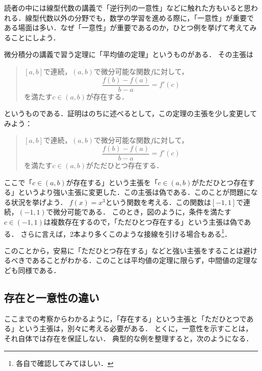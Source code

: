 読者の中には線型代数の講義で「逆行列の一意性」などに触れた方もいると思われる．線型代数以外の分野でも，数学の学習を進める際に，「一意性」が重要である場面は多い．なぜ「一意性」が重要であるのか，ひとつ例を挙げて考えてみることにしよう．

微分積分の講義で習う定理に「平均値の定理」というものがある．
その主張は
\begin{quotation}
  $[a,b]$で連続，$(a,b)$で微分可能な関数$f$に対して，
  \[
    \frac{f(b)-f(a)}{b-a}=f'(c)
  \]
  を満たす$ c \in (a,b)$が存在する．
\end{quotation}

というものである．証明はのちに述べるとして，この定理の主張を少し変更してみよう：

\begin{quotation}
  $[a,b]$で連続，$(a,b)$で微分可能な関数$f$に対して，
  \[
    \frac{f(b)-f(a)}{b-a}=f'(c)
  \]
  を満たす$ c \in (a,b)$がただひとつ存在する．
\end{quotation}


ここで「$c \in (a,b)$が存在する」という主張を「$c \in (a,b)$がただひとつ存在する」というより強い主張に変更した．この主張は偽である．このことが問題になる状況を挙げよう．
$f(x)=x^3$という関数を考える．この関数は$[-1,1]$で連続，$(-1,1)$で微分可能である．
このとき，図のように，条件を満たす$c \in (-1,1)$は複数存在するので，「ただひとつ存在する」という主張は偽である．
さらに言えば，2本より多くこのような接線を引ける場合もある\footnote{各自で確認してみてほしい．}．

このことから，安易に「ただひとつ存在する」などと強い主張をすることは避けるべきであることがわかる．このことは平均値の定理に限らず，中間値の定理なども同様である．

\subsection{存在と一意性の違い}

ここまでの考察からわかるように，「存在する」という主張と「ただひとつである」という主張は，別々に考える必要がある．
とくに，一意性を示すことは，それ自体では存在を保証しない．
典型的な例を整理すると，次のようになる．

